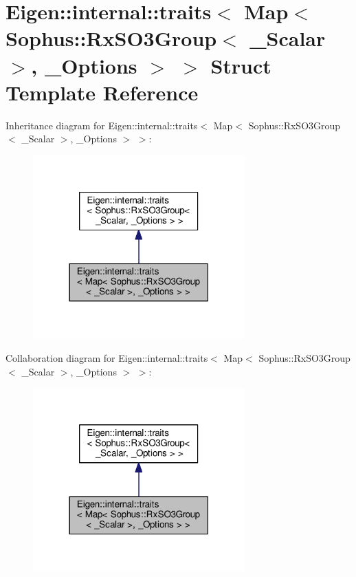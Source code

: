 \hypertarget{struct_eigen_1_1internal_1_1traits_3_01_map_3_01_sophus_1_1_rx_s_o3_group_3_01___scalar_01_4_00_01___options_01_4_01_4}{}\section{Eigen\+:\+:internal\+:\+:traits$<$ Map$<$ Sophus\+:\+:Rx\+S\+O3\+Group$<$ \+\_\+\+Scalar $>$, \+\_\+\+Options $>$ $>$ Struct Template Reference}
\label{struct_eigen_1_1internal_1_1traits_3_01_map_3_01_sophus_1_1_rx_s_o3_group_3_01___scalar_01_4_00_01___options_01_4_01_4}


Inheritance diagram for Eigen\+:\+:internal\+:\+:traits$<$ Map$<$ Sophus\+:\+:Rx\+S\+O3\+Group$<$ \+\_\+\+Scalar $>$, \+\_\+\+Options $>$ $>$\+:
\nopagebreak
\begin{figure}[H]
\begin{center}
\leavevmode
\includegraphics[width=231pt]{struct_eigen_1_1internal_1_1traits_3_01_map_3_01_sophus_1_1_rx_s_o3_group_3_01___scalar_01_4_00_7550b7457758b50dc514ea3270050fb7}
\end{center}
\end{figure}


Collaboration diagram for Eigen\+:\+:internal\+:\+:traits$<$ Map$<$ Sophus\+:\+:Rx\+S\+O3\+Group$<$ \+\_\+\+Scalar $>$, \+\_\+\+Options $>$ $>$\+:
\nopagebreak
\begin{figure}[H]
\begin{center}
\leavevmode
\includegraphics[width=231pt]{struct_eigen_1_1internal_1_1traits_3_01_map_3_01_sophus_1_1_rx_s_o3_group_3_01___scalar_01_4_00_3fd307b06f7ae7f0244bbc8eeb5f035e}
\end{center}
\end{figure}
